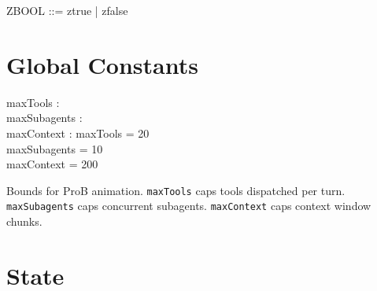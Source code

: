 \documentclass[a4paper,10pt,fleqn]{article}
\begin{document}
\begin{zed}
  ZBOOL ::= ztrue | zfalse
\end{zed}

\section{Global Constants}

\begin{axdef}
  maxTools : \nat \\
  maxSubagents : \nat \\
  maxContext : \nat
  \where
  maxTools = 20 \\
  maxSubagents = 10 \\
  maxContext = 200
\end{axdef}

Bounds for ProB animation. \texttt{maxTools} caps tools dispatched per
turn. \texttt{maxSubagents} caps concurrent subagents.
\texttt{maxContext} caps context window chunks.

\section{State}
\end{document}
